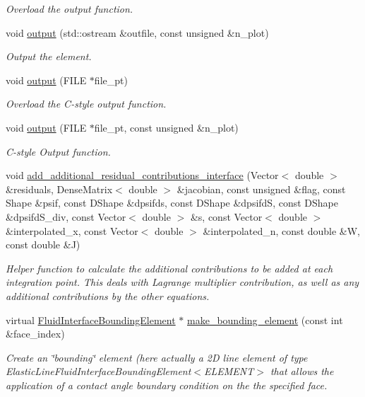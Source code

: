 \begin{DoxyCompactItemize}
\begin{DoxyCompactList}\small\item\em Overload the output function. \end{DoxyCompactList}\item 
void \hyperlink{classoomph_1_1ElasticUpdateFluidInterfaceElement_ac193aa64a8223a96e4148a5af456fb64}{output} (std\+::ostream \&outfile, const unsigned \&n\+\_\+plot)
\begin{DoxyCompactList}\small\item\em Output the element. \end{DoxyCompactList}\item 
void \hyperlink{classoomph_1_1ElasticUpdateFluidInterfaceElement_a8baae14bdede6a659e948942d7a08cb5}{output} (F\+I\+LE $\ast$file\+\_\+pt)
\begin{DoxyCompactList}\small\item\em Overload the C-\/style output function. \end{DoxyCompactList}\item 
void \hyperlink{classoomph_1_1ElasticUpdateFluidInterfaceElement_a10b64a463b5ff98475e727b06d95b0ac}{output} (F\+I\+LE $\ast$file\+\_\+pt, const unsigned \&n\+\_\+plot)
\begin{DoxyCompactList}\small\item\em C-\/style Output function. \end{DoxyCompactList}\item 
void \hyperlink{classoomph_1_1ElasticUpdateFluidInterfaceElement_a15c3d2912325ace17676366c1469121f}{add\+\_\+additional\+\_\+residual\+\_\+contributions\+\_\+interface} (Vector$<$ double $>$ \&residuals, Dense\+Matrix$<$ double $>$ \&jacobian, const unsigned \&flag, const Shape \&psif, const D\+Shape \&dpsifds, const D\+Shape \&dpsifdS, const D\+Shape \&dpsifd\+S\+\_\+div, const Vector$<$ double $>$ \&s, const Vector$<$ double $>$ \&interpolated\+\_\+x, const Vector$<$ double $>$ \&interpolated\+\_\+n, const double \&W, const double \&J)
\begin{DoxyCompactList}\small\item\em Helper function to calculate the additional contributions to be added at each integration point. This deals with Lagrange multiplier contribution, as well as any additional contributions by the other equations. \end{DoxyCompactList}\item 
virtual \hyperlink{classoomph_1_1FluidInterfaceBoundingElement}{Fluid\+Interface\+Bounding\+Element} $\ast$ \hyperlink{classoomph_1_1ElasticUpdateFluidInterfaceElement_a91c59905720a4417447fcce09032ce7f}{make\+\_\+bounding\+\_\+element} (const int \&face\+\_\+index)
\begin{DoxyCompactList}\small\item\em Create an \char`\"{}bounding\char`\"{} element (here actually a 2D line element of type Elastic\+Line\+Fluid\+Interface\+Bounding\+Element$<$\+E\+L\+E\+M\+E\+N\+T$>$ that allows the application of a contact angle boundary condition on the the specified face. \end{DoxyCompactList}\end{DoxyCompactItemize}
